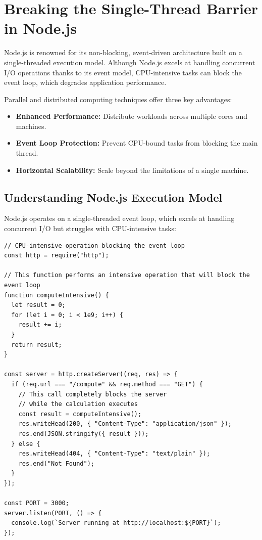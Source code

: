 \setlength{\parindent}{0pt}
\color{primaryColor}

\begin{titlepage}
    \titlepagecontents
\end{titlepage}

\section{Breaking the Single-Thread Barrier in Node.js}

Node.js is renowned for its non-blocking, event-driven architecture built on a single-threaded execution model. Although Node.js excels at handling concurrent I/O operations thanks to its event model, CPU-intensive tasks can block the event loop, which degrades application performance.

Parallel and distributed computing techniques offer three key advantages:

\begin{itemize}
    \item \textbf{\textcolor{accentColor}{Enhanced Performance:}} Distribute workloads across multiple cores and machines.
    
    \item \textbf{\textcolor{accentColor}{Event Loop Protection:}} Prevent CPU-bound tasks from blocking the main thread.
    
    \item \textbf{\textcolor{accentColor}{Horizontal Scalability:}} Scale beyond the limitations of a single machine.
\end{itemize}

\subsection{Understanding Node.js Execution Model}

Node.js operates on a single-threaded event loop, which excels at handling concurrent I/O but struggles with CPU-intensive tasks:

\begin{macterminal}
\begin{lstlisting}
// CPU-intensive operation blocking the event loop
const http = require("http");

// This function performs an intensive operation that will block the event loop
function computeIntensive() {
  let result = 0;
  for (let i = 0; i < 1e9; i++) {
    result += i;
  }
  return result;
}

const server = http.createServer((req, res) => {
  if (req.url === "/compute" && req.method === "GET") {
    // This call completely blocks the server
    // while the calculation executes
    const result = computeIntensive();
    res.writeHead(200, { "Content-Type": "application/json" });
    res.end(JSON.stringify({ result }));
  } else {
    res.writeHead(404, { "Content-Type": "text/plain" });
    res.end("Not Found");
  }
});

const PORT = 3000;
server.listen(PORT, () => {
  console.log(`Server running at http://localhost:${PORT}`);
});
\end{lstlisting}
\end{macterminal}

